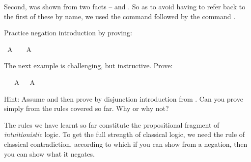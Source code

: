 \begin{isabellebody}
\begin{isamarkuptext}
\end{isamarkuptext}\isamarkuptrue%
%
\begin{isamarkuptext}%
Second,  was shown from two facts --  and . So as to avoid
having to refer back to the first of these by name, we used the command  followed by
the command .%
\end{isamarkuptext}\isamarkuptrue%
%
\begin{isamarkuptext}%
\begin{Exercise} Practice negation introduction by proving: \end{Exercise}%
\end{isamarkuptext}\isamarkuptrue%
\isamarkupfalse%
\ {\isachardoublequoteopen}A\ {\isasymlongrightarrow}\ {\isasymnot}\ {\isasymnot}\ A{\isachardoublequoteclose}%
\isadelimproof
\ %
\endisadelimproof
%
\isatagproof
{}\isamarkupfalse%
%
\endisatagproof
{\isafoldproof}%
%
\isadelimproof
%
\endisadelimproof
%
\begin{isamarkuptext}%
\begin{Exercise}\label{doubleexcludedmiddle} The next example is challenging, but instructive. Prove: \end{Exercise}%
\end{isamarkuptext}\isamarkuptrue%
\isamarkupfalse%
\ {\isachardoublequoteopen}{\isasymnot}\ {\isasymnot}\ {\isacharparenleft}A\ {\isasymor}\ {\isasymnot}\ A{\isacharparenright}{\isachardoublequoteclose}%
\isadelimproof
\ %
\endisadelimproof
%
\isatagproof
{}\isamarkupfalse%
%
\endisatagproof
{\isafoldproof}%
%
\isadelimproof
%
\endisadelimproof
%
\begin{isamarkuptext}%
Hint: Assume  and then prove  by disjunction introduction
from  . Can you prove simply  from the rules covered so far. Why or 
why not?%
\end{isamarkuptext}\isamarkuptrue%
%
\isamarkuptrue%
%
\begin{isamarkuptext}%
The rules we have learnt so far constitute the propositional fragment of \emph{intuitionistic}
logic. To get the full strength of classical logic, we need the rule of classical contradiction,
according to which if you can show  from a negation, then you can show what it negates.

\end{isamarkuptext}
\end{isabellebody}
